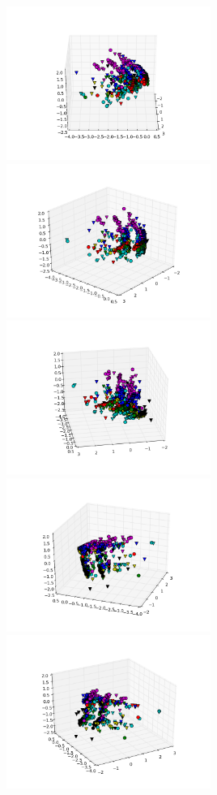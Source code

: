 \includegraphics[width=0.5\textwidth]{img/ej1_oja_01_20}
\includegraphics[width=0.5\textwidth]{img/ej1_oja_01_40}
\includegraphics[width=0.5\textwidth]{img/ej1_oja_01_80}
\includegraphics[width=0.5\textwidth]{img/ej1_oja_01_200}
\includegraphics[width=0.5\textwidth]{img/ej1_oja_01_240}
